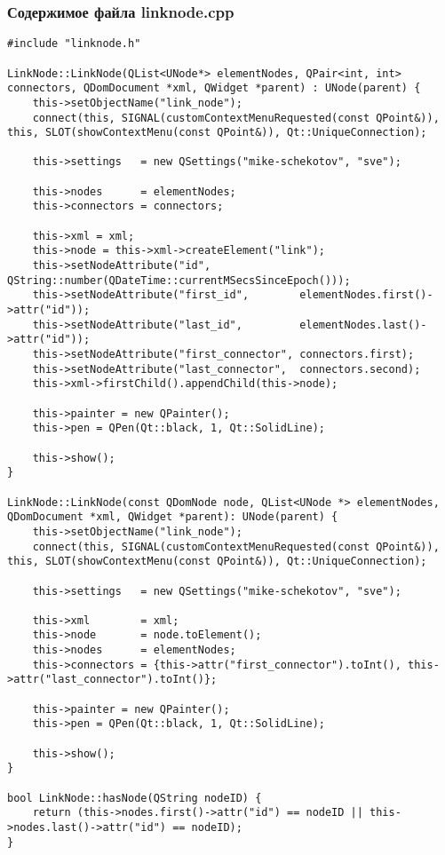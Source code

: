 \subsubsection*{Содержимое файла linknode.cpp}

\begin{lstlisting}
#include "linknode.h"

LinkNode::LinkNode(QList<UNode*> elementNodes, QPair<int, int> connectors, QDomDocument *xml, QWidget *parent) : UNode(parent) {
    this->setObjectName("link_node");
    connect(this, SIGNAL(customContextMenuRequested(const QPoint&)), this, SLOT(showContextMenu(const QPoint&)), Qt::UniqueConnection);

    this->settings   = new QSettings("mike-schekotov", "sve");

    this->nodes      = elementNodes;
    this->connectors = connectors;

    this->xml = xml;
    this->node = this->xml->createElement("link");
    this->setNodeAttribute("id",              QString::number(QDateTime::currentMSecsSinceEpoch()));
    this->setNodeAttribute("first_id",        elementNodes.first()->attr("id"));
    this->setNodeAttribute("last_id",         elementNodes.last()->attr("id"));
    this->setNodeAttribute("first_connector", connectors.first);
    this->setNodeAttribute("last_connector",  connectors.second);
    this->xml->firstChild().appendChild(this->node);

    this->painter = new QPainter();
    this->pen = QPen(Qt::black, 1, Qt::SolidLine);

    this->show();
}

LinkNode::LinkNode(const QDomNode node, QList<UNode *> elementNodes, QDomDocument *xml, QWidget *parent): UNode(parent) {
    this->setObjectName("link_node");
    connect(this, SIGNAL(customContextMenuRequested(const QPoint&)), this, SLOT(showContextMenu(const QPoint&)), Qt::UniqueConnection);

    this->settings   = new QSettings("mike-schekotov", "sve");

    this->xml        = xml;
    this->node       = node.toElement();
    this->nodes      = elementNodes;
    this->connectors = {this->attr("first_connector").toInt(), this->attr("last_connector").toInt()};

    this->painter = new QPainter();
    this->pen = QPen(Qt::black, 1, Qt::SolidLine);

    this->show();
}

bool LinkNode::hasNode(QString nodeID) {
    return (this->nodes.first()->attr("id") == nodeID || this->nodes.last()->attr("id") == nodeID);
}


\end{lstlisting}
